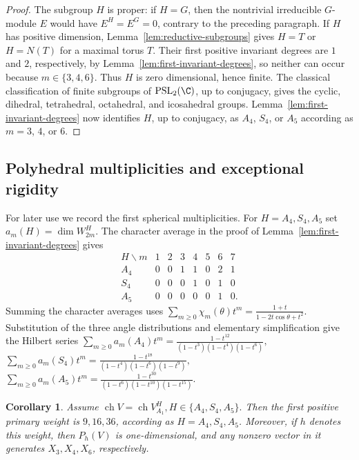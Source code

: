 \documentclass[12pt,leqno]{amsart}
\numberwithin{equation}{section} \newtheorem{thm}{Theorem}[section] \newtheorem{lem}[thm]{Lemma} \newtheorem{ex}[thm]{Example} \newtheorem{prop}[thm]{Proposition} \newtheorem{cor}[thm]{Corollary} \newtheorem{defi}[thm]{Definition} \newtheorem{rmk}[thm]{Remark} \newtheorem{notation}[thm]{Notation}
\newcommand{\ch}{\operatorname{ch}}
\newcommand{\PSLtwo}{\operatorname{PSL}_2(\C)}
\begin{document}
\begin{proof}
The subgroup $H$ is proper: if $H=G$, then the nontrivial irreducible $G$-module $E$ would have $E^H=E^G=0$, contrary to the preceding paragraph. If $H$ has positive dimension, Lemma~\ref{lem:reductive-subgroups} gives $H=T$ or $H=N(T)$ for a maximal torus $T$. Their first positive invariant degrees are $1$ and $2$, respectively, by Lemma~\ref{lem:first-invariant-degrees}, so neither can occur because $m\in\{3,4,6\}$. Thus $H$ is zero dimensional, hence finite. The classical classification of finite subgroups of $\PSLtwo$, up to conjugacy, gives the cyclic, dihedral, tetrahedral, octahedral, and icosahedral groups. Lemma~\ref{lem:first-invariant-degrees} now identifies $H$, up to conjugacy, as $A_4$, $S_4$, or $A_5$ according as $m=3$, $4$, or $6$.
\end{proof}

\subsection{Polyhedral multiplicities and exceptional rigidity}

For later use we record the first spherical multiplicities. For $H=A_4,S_4,A_5$ set \(a_m(H)=\dim W_{2m}^H.\) The character average in the proof of Lemma~\ref{lem:first-invariant-degrees} gives
\[
\begin{array}{c|rrrrrrr}
H\backslash m&1&2&3&4&5&6&7\\ \hline
A_4&0&0&1&1&0&2&1\\
S_4&0&0&0&1&0&1&0\\
A_5&0&0&0&0&0&1&0.
\end{array}
\]
Summing the character averages uses \(\sum_{m\ge0}\chi_m(\theta)t^m=\frac{1+t}{1-2t\cos\theta+t^2}\). Substitution of the three angle distributions and elementary simplification give the Hilbert series \(\sum_{m\ge0}a_m(A_4)t^m=\frac{1-t^{12}}{(1-t^3)(1-t^4)(1-t^6)},\) \(\sum_{m\ge0}a_m(S_4)t^m=\frac{1-t^{18}}{(1-t^4)(1-t^6)(1-t^9)},\) \(\sum_{m\ge0}a_m(A_5)t^m=\frac{1-t^{30}}{(1-t^6)(1-t^{10})(1-t^{15})}.\)

\begin{cor}\label{cor:exceptional-first-simple}
Assume \(\ch V=\ch V_{A_1}^{H},H\in\{A_4,S_4,A_5\}.\) Then the first positive primary weight is \(9,16,36\), according as \(H=A_4,S_4,A_5\). Moreover, if $h$ denotes this weight, then \(P_h(V)\) is one-dimensional, and any nonzero vector in it generates \(X_3,X_4,X_6\), respectively.
\end{cor}
\end{document}
